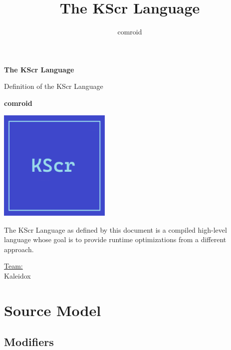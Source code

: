 \documentclass{docs}
\begin{document}
    \title{The KScr Language}
    \author{comroid}
    \begin{titlepage}
        \begin{center}
            \vspace*{1cm}
            
            \Huge
            \textbf{The KScr Language}
            
            \vspace{0.5cm}
            \LARGE
            Definition of the KScr Language
            
            \vspace{1.5cm}
            
            \textbf{comroid}
            
            \vspace{0.8cm}
            
            \includegraphics[width=0.4\textwidth]{img/kscr-icon.png}
            
            \vfill
            
            The KScr Language as defined by this document is a compiled high-level language whose goal is to provide runtime optimizations from a different approach.
            
            \vspace{1.2cm}
            
            \Large
            \underline{Team:} \\
            Kaleidox
        \end{center}
    \end{titlepage}
    \tableofcontents
    \pagebreak
    \section{Source Model}
    \subsection{Modifiers}
\end{document}
